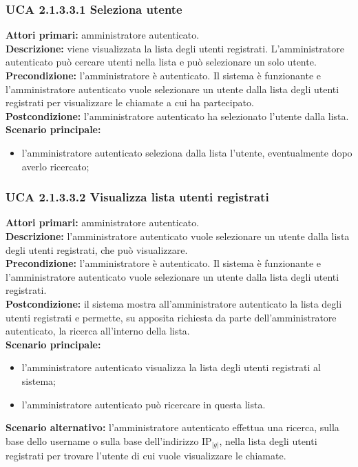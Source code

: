 \subsubsection{UCA 2.1.3.3.1 Seleziona utente}

\noindent
\textbf{Attori primari:} amministratore autenticato.\\
\textbf{Descrizione:} viene visualizzata la lista degli utenti registrati. L'amministratore autenticato può cercare utenti nella lista e può selezionare un solo utente.\\
\textbf{Precondizione:} l'amministratore è autenticato. Il sistema è funzionante e l'amministratore autenticato vuole selezionare un utente dalla lista degli utenti registrati per visualizzare le chiamate a cui ha partecipato.\\
\textbf{Postcondizione:} l'amministratore autenticato ha selezionato l'utente dalla lista.\\
\textbf{Scenario principale:}
\begin{itemize}
\item l'amministratore autenticato seleziona dalla lista l'utente, eventualmente dopo averlo ricercato;
\end{itemize}

\subsubsection{UCA 2.1.3.3.2 Visualizza lista utenti registrati}
\noindent
\textbf{Attori primari:} amministratore autenticato.\\
\textbf{Descrizione:} l'amministratore autenticato vuole selezionare un utente dalla lista degli utenti registrati, che può visualizzare.\\%
\textbf{Precondizione:} l'amministratore è autenticato. Il sistema è funzionante e l'amministratore autenticato vuole selezionare un utente dalla lista degli utenti registrati.\\
\textbf{Postcondizione:} il sistema mostra all'amministratore autenticato la lista degli utenti registrati e permette, su apposita richiesta da parte dell'amministratore autenticato, la ricerca all'interno della lista.\\
\textbf{Scenario principale:}
\begin{itemize}
\item l'amministratore autenticato visualizza la lista degli utenti registrati al sistema;
\item l'amministratore autenticato può ricercare in questa lista.
\end{itemize}
\textbf{Scenario alternativo:} l'amministratore autenticato effettua una ricerca, sulla base dello username o sulla base dell'indirizzo IP$_{|g|}$, nella lista degli utenti registrati per trovare l'utente di cui vuole visualizzare le chiamate.

